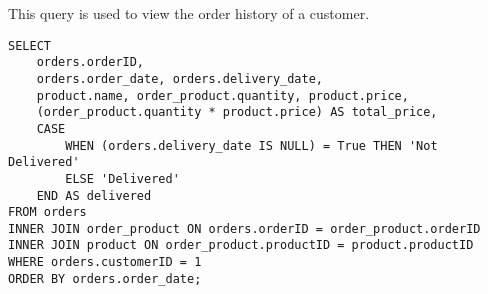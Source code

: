 This query is used to view the order history of a customer.

\begin{lstlisting}
SELECT
    orders.orderID,
    orders.order_date, orders.delivery_date,
    product.name, order_product.quantity, product.price,
    (order_product.quantity * product.price) AS total_price,
    CASE
        WHEN (orders.delivery_date IS NULL) = True THEN 'Not Delivered'
        ELSE 'Delivered'
    END AS delivered
FROM orders
INNER JOIN order_product ON orders.orderID = order_product.orderID
INNER JOIN product ON order_product.productID = product.productID
WHERE orders.customerID = 1
ORDER BY orders.order_date;
\end{lstlisting}